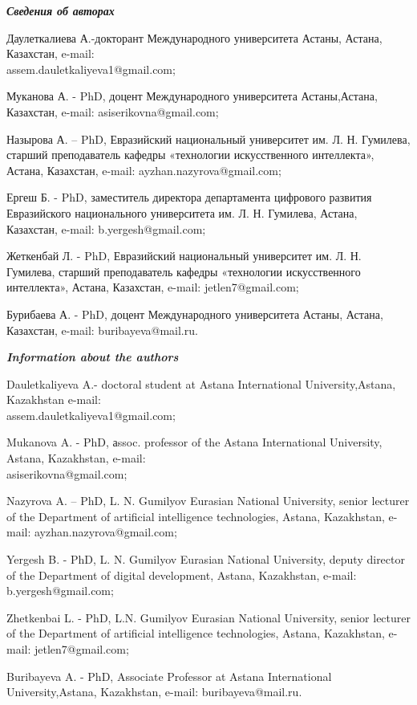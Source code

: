 \begin{authorinfo}
\emph{{\bfseries Сведения об авторах}}

Даулеткалиева А.-докторант Международного университета Астаны, Астана,
Казахстан, e-mail:\\ assem.dauletkaliyeva1@gmail.com;

Муканова А. - PhD, доцент Международного университета Астаны,Астана,
Казахстан, e-mail: asiserikovna@gmail.com;

Назырова А. -- PhD, Евразийский национальный университет им. Л. Н.
Гумилева, старший преподаватель кафедры «технологии искусственного
интеллекта», Астана, Казахстан, e-mail: ayzhan.nazyrova@gmail.com;

Ергеш Б. - PhD, заместитель директора департамента цифрового развития
Евразийского национального университета им. Л. Н. Гумилева, Астана,
Казахстан, e-mail: b.yergesh@gmail.com;

Жеткенбай Л. - PhD, Евразийский национальный университет им. Л. Н.
Гумилева, старший преподаватель кафедры «технологии искусственного
интеллекта», Астана, Казахстан, e-mail: jetlen7@gmail.com;

Бурибаева А. - PhD, доцент Международного университета Астаны, Астана,
Казахстан, e-mail: buribayeva@mail.ru.

\emph{{\bfseries Information about the authors}}

Dauletkaliyeva A.- doctoral student at Astana International
University,Astana, Kazakhstan e-mail:\\
assem.dauletkaliyeva1@gmail.com;

Mukanova A. - PhD, аssoc. professor of the Astana International
University, Astana, Kazakhstan, e-mail: \\asiserikovna@gmail.com;

Nazyrova A. -- PhD, L. N. Gumilyov Eurasian National University, senior
lecturer of the Department of artificial intelligence technologies,
Astana, Kazakhstan, e-mail: ayzhan.nazyrova@gmail.com;

Yergesh B. - PhD, L. N. Gumilyov Eurasian National University, deputy
director of the Department of digital development, Astana, Kazakhstan,
e-mail: b.yergesh@gmail.com;

Zhetkenbai L. - PhD, L.N. Gumilyov Eurasian National University, senior
lecturer of the Department of artificial intelligence technologies,
Astana, Kazakhstan, e-mail: jetlen7@gmail.com;

Buribayeva A. - PhD, Associate Professor at Astana International
University,Astana, Kazakhstan, e-mail: buribayeva@mail.ru.
\end{authorinfo}
